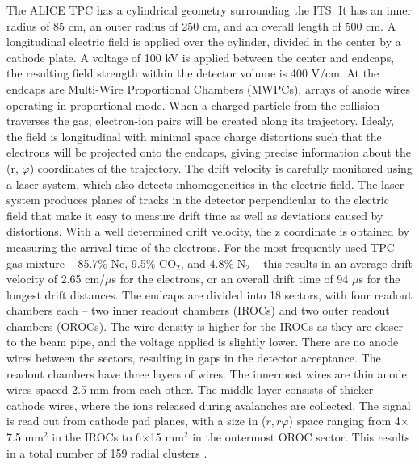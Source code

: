 The ALICE TPC has a cylindrical geometry surrounding the ITS. It has an inner radius of 85 cm, an outer radius of 250 cm, and an overall length of 500 cm. A longitudinal electric field is applied over the cylinder, divided in the center by a cathode plate.  A voltage of 100 kV is applied between the center and endcaps, the resulting field strength within the detector volume is 400 V/cm. At the endcaps are Multi-Wire Proportional Chambers (MWPCs), arrays of anode wires operating in proportional mode. When a charged particle from the collision traverses the gas, electron-ion pairs will be created along its trajectory. Idealy, the field is longitudinal with minimal space charge distortions such that the electrons will be projected onto the endcaps, giving precise information about the (r, $\varphi$) coordinates of the trajectory. The drift velocity is carefully monitored using a laser system, which also detects inhomogeneities in the electric field. The laser system produces planes of tracks in the detector perpendicular to the electric field that make it easy to measure drift time as well as deviations caused by distortions. With a well determined drift velocity, the z coordinate is obtained by measuring the arrival time of the electrons. For the most frequently used TPC gas mixture – 85.7\% Ne, 9.5\% CO$_2$, and 4.8\% N$_2$ – this results in an average drift velocity of 2.65 cm/$\mu$s for the electrons, or an overall drift time of 94 $\mu$s for the longest drift distances. The endcaps are divided into 18 sectors, with four readout chambers each – two inner readout chambers (IROCs) and two outer readout chambers (OROCs). The wire density is higher for the IROCs as they are closer to the beam pipe, and the voltage applied is slightly lower. There are no anode wires between the sectors, resulting in gaps in the detector acceptance. The readout chambers have three layers of wires. The innermost wires are thin anode wires spaced 2.5 mm from each other. The middle layer consists of thicker cathode wires, where the ions released during avalanches are collected. The signal is read out from cathode pad planes, with a size in ($r,r\varphi$) space ranging from 4$\times$7.5 mm$^2$ in the IROCs to 6$\times$15 mm$^2$ in the outermost OROC sector. This results in a total number of 159 radial clusters \cite{Alme2010}.


